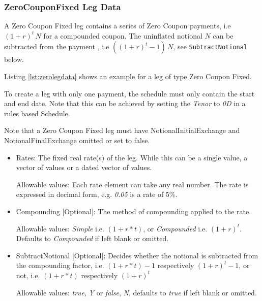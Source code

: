 \subsubsection{ZeroCouponFixed Leg Data}
\label{ss:zerolegdata}

A Zero Coupon Fixed leg contains a series of Zero Coupon payments, i.e $(1 + r)^t \,N$ for a compounded coupon. The uninflated notional $N$ can be subtracted from the payment , i.e $((1 + r)^t-1) \,N$, see \lstinline!SubtractNotional! below.

Listing \ref{lst:zerolegdata} shows an example for a leg of type Zero Coupon Fixed. 

To create a leg with only one payment, the schedule must only contain the start and end date. Note that this can be achieved by setting the \emph{Tenor} to \emph{0D} in a rules based Schedule. 

Note that a Zero Coupon Fixed leg must have NotionalInitialExchange and NotionalFinalExchange omitted or set to false.

\begin{itemize}
\item Rates: The fixed real rate(s) of the leg. While this can be a single value, a vector of values or a dated vector of
  values. 
 
 Allowable values: Each rate element can take any  real number. The rate is
  expressed in decimal form, e.g. \emph{0.05} is a rate of 5\%.
\item Compounding [Optional]:  The method of compounding applied to the rate.

Allowable values: \emph{Simple} i.e. $(1 + r * t)$, or \emph{Compounded} i.e. $(1 + r)^t$. Defaults to \emph{Compounded} if left blank or omitted. 


\item SubtractNotional [Optional]:  Decides whether the notional is
  subtracted from the compounding factor,  i.e. $(1 + r * t)  - 1$
  respectively  $(1 + r)^t - 1$, or not, i.e. $(1 + r * t)$  respectively  $(1 + r)^t$

Allowable values: \emph{true},  \emph{Y} or \emph{false}, \emph{N}, defaults to \emph{true} if left blank or omitted. 

\end{itemize}

